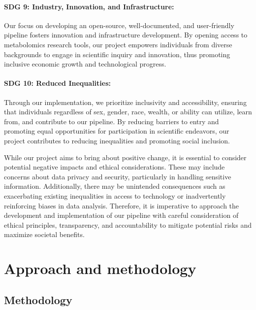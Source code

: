 \documentclass[ENG, BIB]{TFUOC}%
\begin{document}
\subsubsection{SDG 9: Industry, Innovation, and Infrastructure:} 
 
Our focus on developing an open-source, well-documented, and user-friendly pipeline fosters innovation and infrastructure development. By opening access to metabolomics research tools, our project empowers individuals from diverse backgrounds to engage in scientific inquiry and innovation, thus promoting inclusive economic growth and technological progress.
 
\subsubsection{SDG 10: Reduced Inequalities:} 

Through our implementation, we prioritize inclusivity and accessibility, ensuring that individuals regardless of sex, gender, race, wealth, or ability can utilize, learn from, and contribute to our pipeline. By reducing barriers to entry and promoting equal opportunities for participation in scientific endeavors, our project contributes to reducing inequalities and promoting social inclusion. 

\vspace{18pt}

While our project aims to bring about positive change, it is essential to consider potential negative impacts and ethical considerations. These may include concerns about data privacy and security, particularly in handling sensitive information. Additionally, there may be unintended consequences such as exacerbating existing inequalities in access to technology or inadvertently reinforcing biases in data analysis. Therefore, it is imperative to approach the development and implementation of our pipeline with careful consideration of ethical principles, transparency, and accountability to mitigate potential risks and maximize societal benefits.

\chapter{Approach and methodology}
\section{Methodology}
\end{document}
